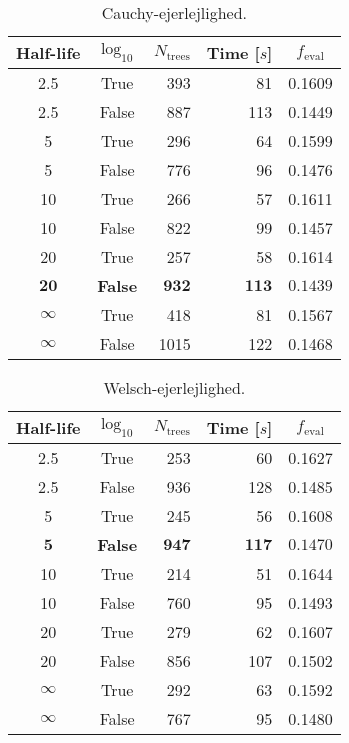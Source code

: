 
\begin{table}[h!]
  \begin{tabular}{@{}ccrrc@{}}
    Half-life & $\log_{10}$ & $N_\mathrm{trees}$ & Time [$s$] & $f_\mathrm{eval}$ \\
    \midrule
    \num{2.5} & True & \num{393} & \num{81} & \num{0.1609} \\
    \num{2.5} & False & \num{887} & \num{113} & \num{0.1449} \\
    \num{5} & True & \num{296} & \num{64} & \num{0.1599} \\
    \num{5} & False & \num{776} & \num{96} & \num{0.1476} \\
    \num{10} & True & \num{266} & \num{57} & \num{0.1611} \\
    \num{10} & False & \num{822} & \num{99} & \num{0.1457} \\
    \num{20} & True & \num{257} & \num{58} & \num{0.1614} \\
    $\mathbf{20}$ & \textbf{False} & $\mathbf{932}$ & $\mathbf{113}$ & $\mathbf{0.1439}$ \\
    $\infty$ & True & \num{418} & \num{81} & \num{0.1567} \\
    $\infty$ & False & \num{1015} & \num{122} & \num{0.1468} \\
  \end{tabular}
  \caption{\label{tab:h:HPO_initial_Cauchy-ejerlejlighed}Cauchy-ejerlejlighed.}
\end{table}


\begin{table}[h!]
  \begin{tabular}{@{}ccrrc@{}}
    Half-life & $\log_{10}$ & $N_\mathrm{trees}$ & Time [$s$] & $f_\mathrm{eval}$ \\
    \midrule
    \num{2.5} & True & \num{253} & \num{60} & \num{0.1627} \\
    \num{2.5} & False & \num{936} & \num{128} & \num{0.1485} \\
    \num{5} & True & \num{245} & \num{56} & \num{0.1608} \\
    $\mathbf{5}$ & \textbf{False} & $\mathbf{947}$ & $\mathbf{117}$ & $\mathbf{0.1470}$ \\
    \num{10} & True & \num{214} & \num{51} & \num{0.1644} \\
    \num{10} & False & \num{760} & \num{95} & \num{0.1493} \\
    \num{20} & True & \num{279} & \num{62} & \num{0.1607} \\
    \num{20} & False & \num{856} & \num{107} & \num{0.1502} \\
    $\infty$ & True & \num{292} & \num{63} & \num{0.1592} \\
    $\infty$ & False & \num{767} & \num{95} & \num{0.1480} \\
  \end{tabular}
  \caption{\label{tab:h:HPO_initial_Welsch-ejerlejlighed}Welsch-ejerlejlighed.}
\end{table}

